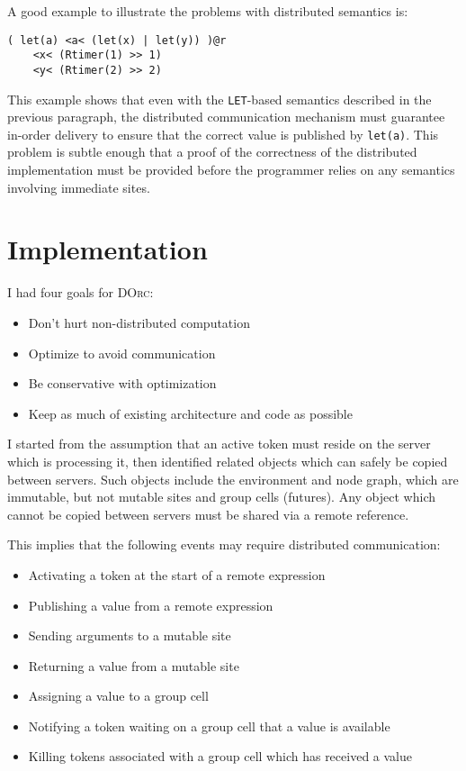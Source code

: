 \documentclass[10pt,letterpaper]{article}
\begin{document}
A good example to illustrate the problems with distributed semantics is:
\begin{verbatim}
( let(a) <a< (let(x) | let(y)) )@r
    <x< (Rtimer(1) >> 1)
    <y< (Rtimer(2) >> 2)
\end{verbatim}
This example shows that even with the \texttt{LET}-based semantics described in
the previous paragraph, the distributed communication mechanism must guarantee
in-order delivery to ensure that the correct value is published by
\texttt{let(a)}.  This problem is subtle enough that a proof of the correctness
of the distributed implementation must be provided before the programmer relies
on any semantics involving immediate sites.

\section{Implementation}

I had four goals for \textsc{DOrc}:
\begin{itemize}
\item Don't hurt non-distributed computation
\item Optimize to avoid communication
\item Be conservative with optimization
\item Keep as much of existing architecture and code as possible
\end{itemize}

I started from the assumption that an active token must reside on the server
which is processing it, then identified related objects which can safely be
copied between servers. Such objects include the environment and node graph,
which are immutable, but not mutable sites and group cells (futures). Any
object which cannot be copied between servers must be shared via a remote
reference.

This implies that the following events may require distributed communication:
\begin{itemize}
\item Activating a token at the start of a remote expression
\item Publishing a value from a remote expression
\item Sending arguments to a mutable site
\item Returning a value from a mutable site
\item Assigning a value to a group cell
\item Notifying a token waiting on a group cell that a value is available
\item Killing tokens associated with a group cell which has received a value
\end{itemize}
\end{document}
